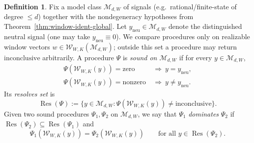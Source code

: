 \documentclass[11pt,reqno]{amsart}
\theoremstyle{definition}
\newtheorem{definition}[theorem]{Definition}
\theoremstyle{remark}
\newcommand{\1}{\mathbf{1}}
\newcommand{\zero}{\mathrm{zero}}
\newcommand{\nonzero}{\mathrm{nonzero}}
\newcommand{\inconclusive}{\mathrm{inconclusive}}
\begin{document}
\begin{definition}\label{def:domination}
Fix a model class $\mathcal{M}_{d,W}$ of signals (e.g.\ rational/finite-state of degree $\le d$) together with the
nondegeneracy hypotheses from Theorem~\ref{thm:window-ident-global}.
Let $y_{\mathrm{neu}}\in\mathcal{M}_{d,W}$ denote the distinguished neutral signal (one may take $y_{\mathrm{neu}}\equiv 0$).
We compare procedures only on realizable window vectors $w\in\mathcal{W}_{W,K}(\mathcal{M}_{d,W})$; outside this set a procedure may return $\inconclusive$ arbitrarily.
A procedure $\Psi$ is \emph{sound on $\mathcal{M}_{d,W}$} if for every $y\in\mathcal{M}_{d,W}$,
\begin{align*}
\Psi(\mathcal{W}_{W,K}(y))=\zero &\ \Longrightarrow\ y=y_{\mathrm{neu}},\\
\Psi(\mathcal{W}_{W,K}(y))=\nonzero &\ \Longrightarrow\ y\neq y_{\mathrm{neu}}.
\end{align*}
Its \emph{resolves set} is
\[
\operatorname{Res}(\Psi):=\{y\in\mathcal{M}_{d,W}:\Psi(\mathcal{W}_{W,K}(y))\neq \inconclusive\}.
\]
Given two sound procedures $\Psi_1,\Psi_2$ on $\mathcal{M}_{d,W}$, we say that $\Psi_1$ \emph{dominates} $\Psi_2$
if $\operatorname{Res}(\Psi_2)\subseteq \operatorname{Res}(\Psi_1)$ and
\[
\Psi_1(\mathcal{W}_{W,K}(y))=\Psi_2(\mathcal{W}_{W,K}(y))\qquad\text{for all }y\in \operatorname{Res}(\Psi_2).
\]
\end{definition}
\end{document}
